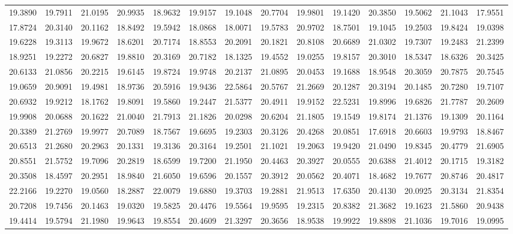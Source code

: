 \documentclass[12pt]{article}\usepackage[]{graphicx}\usepackage[]{color}
\begin{document}
\begin{landscape}
\begin{longtable}[t]{rrrrrrrrrrrrrr}
19.3890 & 19.7911 & 21.0195 & 20.9935 & 18.9632 & 19.9157 & 19.1048 & 20.7704 & 19.9801 & 19.1420 & 20.3850 & 19.5062 & 21.1043 & 17.9551\\
17.8724 & 20.3140 & 20.1162 & 18.8492 & 19.5942 & 18.0868 & 18.0071 & 19.5783 & 20.9702 & 18.7501 & 19.1045 & 19.2503 & 19.8424 & 19.0398\\
19.6228 & 19.3113 & 19.9672 & 18.6201 & 20.7174 & 18.8553 & 20.2091 & 20.1821 & 20.8108 & 20.6689 & 21.0302 & 19.7307 & 19.2483 & 21.2399\\
18.9251 & 19.2272 & 20.6827 & 19.8810 & 20.3169 & 20.7182 & 18.1325 & 19.4552 & 19.0255 & 19.8157 & 20.3010 & 18.5347 & 18.6326 & 20.3425\\
20.6133 & 21.0856 & 20.2215 & 19.6145 & 19.8724 & 19.9748 & 20.2137 & 21.0895 & 20.0453 & 19.1688 & 18.9548 & 20.3059 & 20.7875 & 20.7545\\
19.0659 & 20.9091 & 19.4981 & 18.9736 & 20.5916 & 19.9436 & 22.5864 & 20.5767 & 21.2669 & 20.1287 & 20.3194 & 20.1485 & 20.7280 & 19.7107\\
20.6932 & 19.9212 & 18.1762 & 19.8091 & 19.5860 & 19.2447 & 21.5377 & 20.4911 & 19.9152 & 22.5231 & 19.8996 & 19.6826 & 21.7787 & 20.2609\\
19.9908 & 20.0688 & 20.1622 & 21.0040 & 21.7913 & 21.1826 & 20.0298 & 20.6204 & 21.1805 & 19.1549 & 19.8174 & 21.1376 & 19.1309 & 20.1164\\
20.3389 & 21.2769 & 19.9977 & 20.7089 & 18.7567 & 19.6695 & 19.2303 & 20.3126 & 20.4268 & 20.0851 & 17.6918 & 20.6603 & 19.9793 & 18.8467\\
20.6513 & 21.2680 & 20.2963 & 20.1331 & 19.3136 & 20.3164 & 19.2501 & 21.1021 & 19.2063 & 19.9420 & 21.0490 & 19.8345 & 20.4779 & 21.6905\\
20.8551 & 21.5752 & 19.7096 & 20.2819 & 18.6599 & 19.7200 & 21.1950 & 20.4463 & 20.3927 & 20.0555 & 20.6388 & 21.4012 & 20.1715 & 19.3182\\
20.3508 & 18.4597 & 20.2951 & 18.9840 & 21.6050 & 19.6596 & 20.1557 & 20.3912 & 20.0562 & 20.4071 & 18.4682 & 19.7677 & 20.8746 & 20.4817\\
22.2166 & 19.2270 & 19.0560 & 18.2887 & 22.0079 & 19.6880 & 19.3703 & 19.2881 & 21.9513 & 17.6350 & 20.4130 & 20.0925 & 20.3134 & 21.8354\\
20.7208 & 19.7456 & 20.1463 & 19.0320 & 19.5825 & 20.4476 & 19.5564 & 19.9595 & 19.2315 & 20.8382 & 21.3682 & 19.1623 & 21.5860 & 20.9438\\
19.4414 & 19.5794 & 21.1980 & 19.9643 & 19.8554 & 20.4609 & 21.3297 & 20.3656 & 18.9538 & 19.9922 & 19.8898 & 21.1036 & 19.7016 & 19.0995\\

\end{longtable}
\end{landscape}
\end{document}

